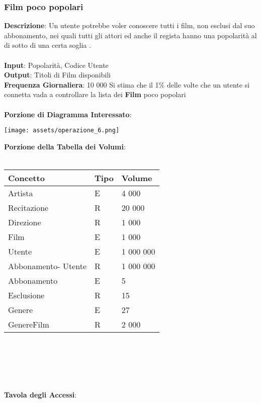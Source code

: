 \documentclass{article}
\begin{document}
\subsubsection{Film poco popolari}
\textbf{Descrizione}: Un utente potrebbe voler conoscere tutti i film, non esclusi dal suo abbonamento, nei quali tutti gli attori ed anche il regista hanno una popolarità al di sotto di una certa soglia .\\ \\
\textbf{Input}: Popolarità, Codice Utente \\
\textbf{Output}: Titoli di Film disponibili \\
\textbf{Frequenza Giornaliera}: 10 000 Si stima che il 1\% delle volte che un utente si connetta vada a controllare la lista dei \textbf{Film} poco popolari \\ \\
\textbf{Porzione di Diagramma Interessato}: \\
\begin{center}
    \centering
    \texttt{[image: assets/operazione\_6.png]}
\end{center}
\textbf{Porzione della Tabella dei Volumi}: \\ \\
\begin{tabular}{|C{2.6cm}|C{2.6cm}|C{2.6cm}|}
\hline
    \textbf{Concetto} & \textbf{Tipo} & \textbf{Volume} \\
\hline 
    Artista & E & 4 000 \\ 
\hline
    Recitazione & R & 20 000 \\ 
\hline
    Direzione & R & 1 000\\ 
\hline
    Film & E & 1 000 \\ 
\hline
    Utente & E & 1 000 000 \\ 
\hline
    Abbonamento- Utente & R & 1 000 000\\ 
\hline
    Abbonamento & E & 5 \\ 
\hline
    Esclusione & R & 15 \\ 
\hline
    Genere & E & 27\\ 
\hline
    GenereFilm & R & 2 000 \\ 
\hline
\end{tabular}
\\ \\ \\ \\ \\ 
\textbf{Tavola degli Accessi}: \\ \\
\end{document}

